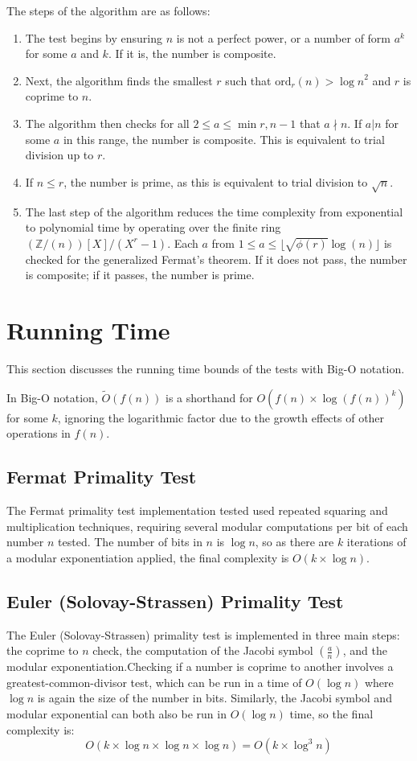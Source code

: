 \documentclass{article}
\begin{document}
The steps of the algorithm are as follows:
\begin{enumerate}
    \item The test begins by ensuring $n$ is not a perfect power, or a number of form $a^k$ for some $a$ and $k$. If it is, the number is composite.
    \item Next, the algorithm finds the smallest $r$ such that $\textrm{ord}_r(n) > {\log{n}}^2$ and $r$ is coprime to $n$.
    \item The algorithm then checks for all $2 \leq a \leq \min{r, n - 1}$ that $a \nmid n$. If $a \vert n$ for some $a$ in this range, the number is composite. This is equivalent to trial division up to $r$.
    \item If $n \leq r$, the number is prime, as this is equivalent to trial division to $\sqrt{n}$.
    \item The last step of the algorithm reduces the time complexity from exponential to polynomial time by operating over the finite ring $(\mathbb{Z}/(n))[X] / (X^r - 1)$. Each $a$ from $1 \leq a \leq \lfloor \sqrt{\phi(r)}\log(n) \rfloor$ is checked for the generalized Fermat's theorem. If it does not pass, the number is composite; if it passes, the number is prime.
\end{enumerate}

\section{Running Time}
This section discusses the running time bounds of the tests with Big-O notation.

In Big-O notation, $\widetilde{O}(f(n))$ is a shorthand for $O(f(n) \times \log{(f(n))}^k)$ for some $k$, ignoring the logarithmic factor due to the growth effects of other operations in $f(n)$.

\subsection{Fermat Primality Test}
The Fermat primality test implementation tested used repeated squaring and multiplication techniques, requiring several modular computations per bit of each number $n$ tested. The number of bits in $n$ is $\log{n}$, so as there are $k$ iterations of a modular exponentiation applied, the final complexity is $O(k \times \log{n})$.

\subsection{Euler (Solovay-Strassen) Primality Test}
The Euler (Solovay-Strassen) primality test is implemented in three main steps: the coprime to $n$ check, the computation of the Jacobi symbol $\left(\frac{a}{n}\right)$, and the modular exponentiation.Checking if a number is coprime to another involves a greatest-common-divisor test, which can be run in a time of $O(\log{n})$ where $\log{n}$ is again the size of the number in bits. Similarly, the Jacobi symbol and modular exponential can both also be run in $O(\log{n})$ time, so the final complexity is:
\[
    O(k \times \log{n} \times \log{n} \times \log{n}) = O(k \times \log^3{n})
\]
\end{document}
